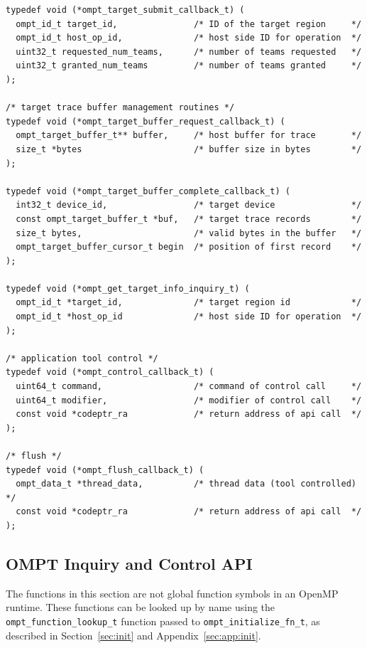 \documentclass{article}
\begin{document}
\begin{verbatim}
typedef void (*ompt_target_submit_callback_t) (
  ompt_id_t target_id,               /* ID of the target region     */
  ompt_id_t host_op_id,              /* host side ID for operation  */
  uint32_t requested_num_teams,      /* number of teams requested   */
  uint32_t granted_num_teams         /* number of teams granted     */
);

/* target trace buffer management routines */
typedef void (*ompt_target_buffer_request_callback_t) (
  ompt_target_buffer_t** buffer,     /* host buffer for trace       */
  size_t *bytes                      /* buffer size in bytes        */
);
  
typedef void (*ompt_target_buffer_complete_callback_t) (
  int32_t device_id,                 /* target device               */
  const ompt_target_buffer_t *buf,   /* target trace records        */
  size_t bytes,                      /* valid bytes in the buffer   */
  ompt_target_buffer_cursor_t begin  /* position of first record    */
);

typedef void (*ompt_get_target_info_inquiry_t) (
  ompt_id_t *target_id,              /* target region id            */
  ompt_id_t *host_op_id              /* host side ID for operation  */
);

/* application tool control */
typedef void (*ompt_control_callback_t) (
  uint64_t command,                  /* command of control call     */
  uint64_t modifier,                 /* modifier of control call    */
  const void *codeptr_ra             /* return address of api call  */
);

/* flush */
typedef void (*ompt_flush_callback_t) (
  ompt_data_t *thread_data,          /* thread data (tool controlled) */
  const void *codeptr_ra             /* return address of api call  */
);

\end{verbatim}


\clearpage
\subsection{OMPT Inquiry and Control API}

The functions in this section are not global function symbols in an OpenMP runtime. These functions can be looked up by name using the \verb|ompt_function_lookup_t| function passed to \verb|ompt_initialize_fn_t|, as described in Section~\ref{sec:init} and Appendix~\ref{sec:app:init}.
\end{document}
